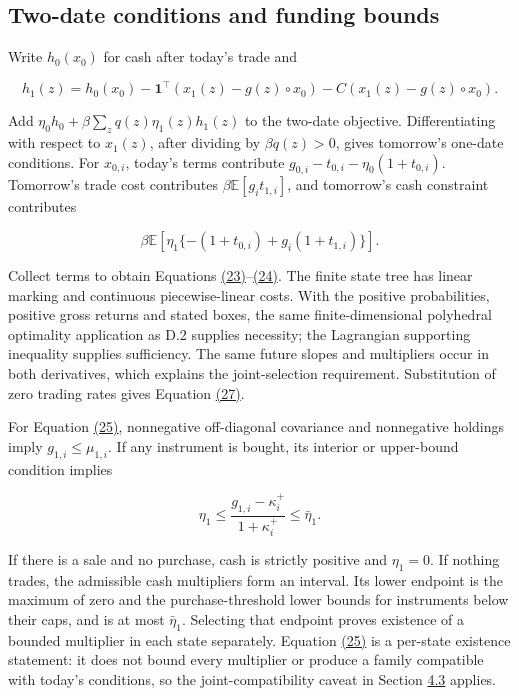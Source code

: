 \documentclass[11pt]{article}
\begin{document}
\subsection{Two-date conditions and funding bounds}\label{sec:D.6}

Write \(h_0(x_0)\) for cash after today's trade and

\begin{equation*}
h_1(z)=h_0(x_0)-\mathbf1^\top(x_1(z)-g(z)\mathbin{\circ}x_0)
-C(x_1(z)-g(z)\mathbin{\circ}x_0).
\end{equation*}

Add \(\eta_0h_0+\beta\sum_zq(z)\eta_1(z)h_1(z)\) to the two-date objective. Differentiating with respect to \(x_1(z)\), after dividing by \(\beta q(z)>0\), gives tomorrow's one-date conditions. For \(x_{0,i}\), today's terms contribute \(g_{0,i}-t_{0,i}-\eta_0(1+t_{0,i})\). Tomorrow's trade cost contributes \(\beta\mathbb E[g_i t_{1,i}]\), and tomorrow's cash constraint contributes

\begin{equation*}
\beta\mathbb E\!\left[\eta_1\{-(1+t_{0,i})+g_i(1+t_{1,i})\}\right].
\end{equation*}

Collect terms to obtain Equations \hyperref[eq:23]{(23)}--\hyperref[eq:24]{(24)}. The finite state tree has linear marking and continuous piecewise-linear costs. With the positive probabilities, positive gross returns and stated boxes, the same finite-dimensional polyhedral optimality application as D.2 supplies necessity; the Lagrangian supporting inequality supplies sufficiency. The same future slopes and multipliers occur in both derivatives, which explains the joint-selection requirement. Substitution of zero trading rates gives Equation \hyperref[eq:27]{(27)}.

For Equation \hyperref[eq:25]{(25)}, nonnegative off-diagonal covariance and nonnegative holdings imply \(g_{1,i}\leq\mu_{1,i}\). If any instrument is bought, its interior or upper-bound condition implies

\begin{equation*}
\eta_1\leq\frac{g_{1,i}-\kappa_i^+}{1+\kappa_i^+}
\leq\bar\eta_1.
\end{equation*}

If there is a sale and no purchase, cash is strictly positive and \(\eta_1=0\). If nothing trades, the admissible cash multipliers form an interval. Its lower endpoint is the maximum of zero and the purchase-threshold lower bounds for instruments below their caps, and is at most \(\bar\eta_1\). Selecting that endpoint proves existence of a bounded multiplier in each state separately. Equation \hyperref[eq:25]{(25)} is a per-state existence statement: it does not bound every multiplier or produce a family compatible with today's conditions, so the joint-compatibility caveat in Section \hyperref[sec:4.3]{4.3} applies.
\end{document}
